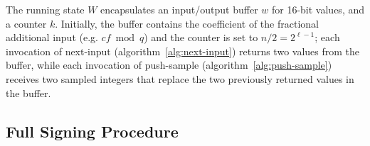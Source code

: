 \documentclass{llncs}
\begin{document}
The running state $W$ encapsulates an input/output buffer $w$ for 16-bit
values, and a counter $k$. Initially, the buffer contains the
coefficient of the fractional additional input (e.g. $cf \bmod q$) and
the counter is set to $n/2 = 2^{\ell - 1}$; each invocation of
\textsf{next-input} (algorithm~\ref{alg:next-input}) returns two values
from the buffer, while each invocation of \textsf{push-sample}
(algorithm~\ref{alg:push-sample}) receives two sampled integers that
replace the two previously returned values in the buffer.

\begin{algorithm}
    \caption{\ \ \textsf{next-input}\label{alg:next-input}}
    \begin{algorithmic}[1]
    \end{algorithmic}
\end{algorithm}

\begin{algorithm}
    \caption{\ \ \textsf{push-sample}\label{alg:push-sample}}
    \begin{algorithmic}[1]
    \end{algorithmic}
\end{algorithm}

\subsection{Full Signing Procedure}
\end{document}
